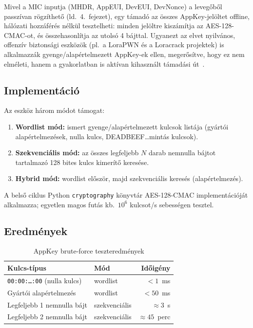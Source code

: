 \documentclass[12pt,a4paper]{article}
\begin{document}
Mivel a MIC inputja (MHDR, AppEUI, DevEUI, DevNonce) a levegőből
passz\-ív\-an rögzíthető (ld.\ 4.\ fejezet), egy támadó az összes AppKey-jelöltet
offline, hálózati hozzáférés nélkül tesztelheti: minden jelöltre kiszámítja
az AES-128-CMAC-ot, és összehasonlítja az utolsó 4 bájttal. Ugyanezt az elvet
nyilvános, offenzív biztonsági eszközök (pl.\ a LoraPWN és a Loracrack
projektek) is alkalmazzák gyenge/alapértelmezett AppKey-ek ellen, megerősítve,
hogy ez nem elméleti, hanem a gyakorlatban is aktívan kihasznált
támadási út~\cite{gauging2021, loracrack2025}.

\subsection{Implementáció}

Az eszköz három módot támogat:

\begin{enumerate}
    \item \textbf{Wordlist mód:} ismert gyenge/alapértelmezett kulcsok listája
    (gyártói alapértelmezések, nulla kulcs, DEADBEEF\ldots mintás kulcsok).
    \item \textbf{Szekvenciális mód:} az összes legfeljebb $N$ darab nemnulla
    bájtot tartalmazó 128 bites kulcs kimerítő keresése.
    \item \textbf{Hybrid mód:} wordlist először, majd szekvenciális keresés
    (alapértelmezés).
\end{enumerate}

A belső ciklus Python \texttt{cryptography} könyvtár AES-128-CMAC implementációját
alkalmazza; egyetlen magos futás kb.\ $10^6$ kulcsot/s sebességen tesztel.

\subsection{Eredmények}

\begin{table}[H]
\centering
\caption{AppKey brute-force teszteredmények}
\begin{tabular}{llr}
\toprule
Kulcs-típus & Mód & Időigény \\
\midrule
\texttt{00:00:\ldots:00} (nulla kulcs) & wordlist & $<1$~ms \\
Gyártói alapértelmezés & wordlist & $<50$~ms \\
Legfeljebb 1 nemnulla bájt & szekvenciális & $\approx 3$~s \\
Legfeljebb 2 nemnulla bájt & szekvenciális & $\approx 45$~perc \\
\bottomrule
\end{tabular}
\end{table}
\end{document}
